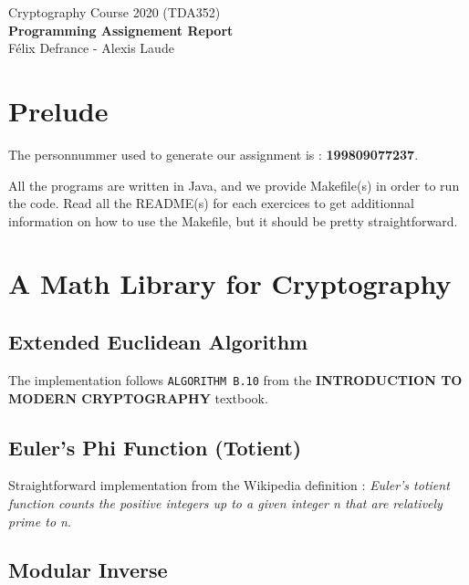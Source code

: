 \documentclass[12pt]{article}
\begin{document}
\begin{titlepage}
   \begin{center}
      \Large{Cryptography Course 2020 (TDA352)\\ \textbf{Programming Assignement Report}}\\
      \large{Félix Defrance - Alexis Laude}
   \end{center}
\end{titlepage}

\section*{Prelude}

The personnummer used to generate our assignment is : \textbf{{\large 199809077237}}.

All the programs are written in Java, and we provide Makefile(s) in order to run the code. Read all the README(s) for each exercices to get additionnal information on how to use the Makefile, but it should be pretty straightforward.

\newpage
\section{A Math Library for Cryptography}

\subsection{Extended Euclidean Algorithm}

The implementation follows \verb+ALGORITHM B.10+ from the \textbf{INTRODUCTION TO MODERN CRYPTOGRAPHY} textbook.

\subsection{Euler's Phi Function (Totient)}

Straightforward implementation from the Wikipedia definition : \textit{Euler's totient function counts the positive integers up to a given integer n that are relatively prime to n}.

\subsection{Modular Inverse}
\end{document}
